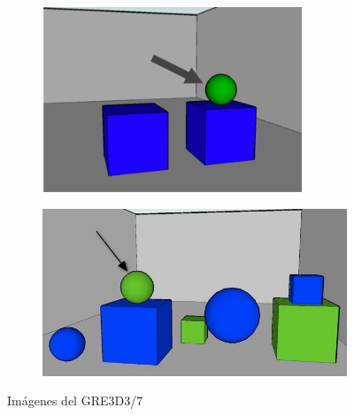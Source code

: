 \begin{figure}[!ht]
\begin{subfigure}{.35\textwidth}
\centering
\includegraphics[width=\textwidth]{images/GRE3D3.png}\\[0pt]
\caption{}
\label{fig-GRE3D3}
\end{subfigure}
\hspace*{0cm}
\begin{subfigure}{.65\textwidth}

\centering
\includegraphics[width=\textwidth]{images/3.jpg}\\[0pt]
\caption{}
\label{fig-GRE3D7}
\end{subfigure}
\caption{Im\'agenes del GRE3D3/7}\label{imagenes-GRE3D3-GRE3D7}
\end{figure}

\vspace*{1cm}

